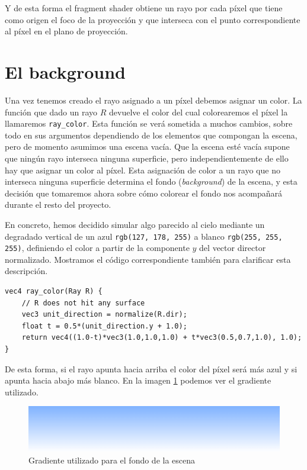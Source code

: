 Y de esta forma el fragment shader obtiene un rayo por cada píxel que tiene como origen el foco de la proyección y que interseca con el punto correspondiente al píxel en el plano de proyección.

\section{El background}

Una vez tenemos creado el rayo asignado a un píxel debemos asignar un color. La función que dado un rayo $R$ devuelve el color del cual colorearemos el píxel la llamaremos \verb|ray_color|. Esta función se verá sometida a muchos cambios, sobre todo en sus argumentos dependiendo de los elementos que compongan la escena, pero de momento asumimos una escena vacía. Que la escena esté vacía supone que ningún rayo interseca ninguna superficie, pero independientemente de ello hay que asignar un color al píxel. Esta asignación de color a un rayo que no interseca ninguna superficie determina el fondo (\textit{background}) de la escena, y esta decisión que tomaremos ahora sobre cómo colorear el fondo nos acompañará durante el resto del proyecto. 

En concreto, hemos decidido simular algo parecido al cielo mediante un degradado vertical de un \textcolor{background-blue}{azul} \texttt{rgb(127, 178, 255)} a blanco \texttt{rgb(255, 255, 255)}, definiendo el color a partir de la componente $y$ del vector director normalizado. Mostramos el código correspondiente también para clarificar esta descripción.

\begin{lstlisting}
vec4 ray_color(Ray R) {
    // R does not hit any surface
    vec3 unit_direction = normalize(R.dir);
    float t = 0.5*(unit_direction.y + 1.0);
    return vec4((1.0-t)*vec3(1.0,1.0,1.0) + t*vec3(0.5,0.7,1.0), 1.0);
}
\end{lstlisting}

De esta forma, si el rayo apunta hacia arriba el color del píxel será más azul y si apunta hacia abajo más blanco. En la imagen \ref{fig:background} podemos ver el gradiente utilizado.

\begin{figure} [ht]
    \centering
    \includegraphics[scale = 0.35]{img/C7/background-gradient.png}
    \caption{Gradiente utilizado para el fondo de la escena}
    \label{fig:background}
\end{figure}

